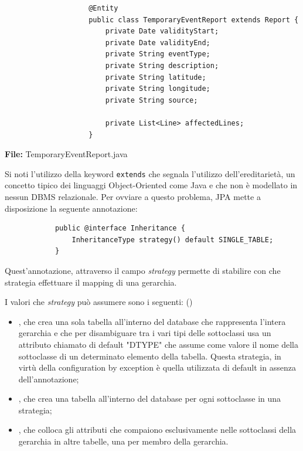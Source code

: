         \begin{framed}
            \begin{code}
                \begin{verbatim}
                    @Entity
                    public class TemporaryEventReport extends Report {        
                        private Date validityStart;
                        private Date validityEnd;
                        private String eventType;
                        private String description;
                        private String latitude;
                        private String longitude;
                        private String source;

                        private List<Line> affectedLines;
                    }
                \end{verbatim}  
                \caption{\textbf{File:} TemporaryEventReport.java}
            \end{code}
        \end{framed}
        
        Si noti l'utilizzo della keyword \texttt{extends} che segnala l'utilizzo dell'ereditarietà, un concetto tipico dei linguaggi Object-Oriented come Java e che non è modellato in nessun DBMS relazionale. Per ovviare a questo problema, JPA mette a disposizione la seguente annotazione: 

        \begin{verbatim}
            public @interface Inheritance {
                InheritanceType strategy() default SINGLE_TABLE;
            }
        \end{verbatim}

        Quest'annotazione, attraverso il campo \textit{strategy} permette di stabilire con che strategia effettuare il mapping di una gerarchia.

        I valori che \textit{strategy} può assumere sono i seguenti: (\cite{jee7})

        \begin{itemize}
            \item {}, che crea una sola tabella all'interno del database che rappresenta l'intera gerarchia e che per disambiguare tra i vari tipi delle sottoclassi usa un attributo chiamato di default "DTYPE" che assume come valore il nome della sottoclasse di un determinato elemento della tabella. Questa strategia, in virtù della configuration by exception è quella utilizzata di default in assenza dell'annotazione;
            \item {}, che crea una tabella all'interno del database per ogni sottoclasse in una strategia;
            \item {}, che colloca gli attributi che compaiono esclusivamente nelle sottoclassi della gerarchia in altre tabelle, una per membro della gerarchia.
        \end{itemize}

